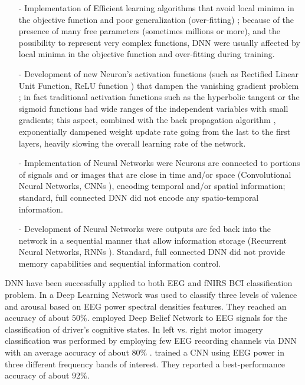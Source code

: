 \documentclass[12pt ]{iopart}
\begin{document}
\begin{itemize}
	\item[-] Implementation of Efficient learning algorithms that avoid local minima in the objective function and poor generalization (over-fitting) \parencite{kingma2014adam} ; because of the presence of many free parameters (sometimes millions or more), and the possibility to represent very complex functions, DNN were usually affected by local minima in the objective function and over-fitting  during training. 
	\item[-] Development of new Neuron's activation functions (such as Rectified Linear Unit Function, ReLU function \parencite{dahl2013improving, maas2013rectifier}) that dampen  the vanishing gradient problem \parencite{pascanu2013difficulty}; in fact traditional activation functions such as the hyperbolic tangent or the sigmoid functions had wide ranges of the independent variables with small gradients;  this aspect, combined with the back propagation algorithm \parencite{hecht1988theory}, exponentially dampened weight update rate going from the last to the first layers, heavily slowing the overall learning rate of the network.
	\item[-] Implementation of  Neural Networks were Neurons are connected to portions of signals and or images that are close in time and/or space (Convolutional Neural Networks, CNNs \parencite{krizhevsky2012imagenet, kalchbrenner2014convolutional}), encoding temporal and/or spatial information; standard, full connected DNN  did not encode any spatio-temporal information.
	\item[-] Development of  Neural Networks were outputs are fed back into the network in a sequential manner that allow information storage (Recurrent Neural Networks, RNNs \parencite{mikolov2010recurrent, hochreiter1997long}). Standard, full connected DNN  did not provide memory capabilities and sequential information control.
\end{itemize}

DNN have been successfully applied to  both EEG and fNIRS BCI classification problem. In \textcite{jirayucharoensak2014eeg} a Deep Learning Network was used to classify three levels of valence and arousal based on EEG power spectral densities  features. They reached an accuracy of about $50\%$. 
\textcite{hajinoroozi2015feature} employed Deep Belief Network to EEG signals for the classification of driver's cognitive states. 
In \textcite{an2014deep} left vs. right motor imagery classification  was performed by employing few EEG recording channels via DNN with an average accuracy of about $80\%$ . 
 \textcite{bashivan2015learning} trained a CNN using EEG power in three different frequency bands of interest. They reported a best-performance accuracy of about $92\%$.
\end{document}
